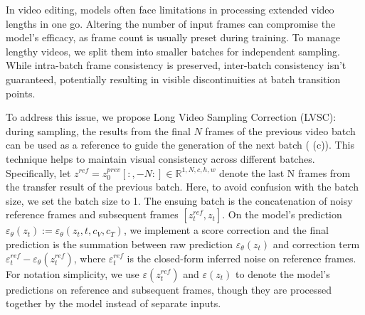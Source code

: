 
In video editing, models often face limitations in processing extended video lengths in one go. Altering the number of input frames can compromise the model's efficacy, as frame count is usually preset during training. To manage lengthy videos, we split them into smaller batches for independent sampling. While intra-batch frame consistency is preserved, inter-batch consistency isn't guaranteed, potentially resulting in visible discontinuities at batch transition points.

To address this issue, we propose Long Video Sampling Correction (LVSC): during sampling, the results from the final $N$ frames of the previous video batch can be used as a reference to guide the generation of the next batch ( (c)). This technique helps to maintain visual consistency across different batches. Specifically, let $z^{ref} = z^{prev}_0[:, -N:] \in \mathbb{R}^{1, N, c, h, w}$ denote the last N frames from the transfer result of the previous batch. Here, to avoid confusion with the batch size, we set the batch size to 1. The ensuing batch is the concatenation of noisy reference frames and subsequent frames $[z^{ref}_t, z_t]$. On the model's prediction $\varepsilon_\theta(z_t) := \varepsilon_\theta(z_t, t, c_V, c_T)$, we implement a score correction and the final prediction is the summation between raw prediction $\varepsilon_\theta(z_t)$ and correction term $\varepsilon_t^{ref}-\varepsilon_\theta(z_t^{ref})$, where $\varepsilon_t^{ref}$ is the closed-form inferred noise on reference frames. For notation simplicity, we use $\varepsilon(z_t^{ref})$ and $\varepsilon(z_t)$ to denote the model's predictions on reference and subsequent frames, though they are processed together by the model instead of separate inputs.


